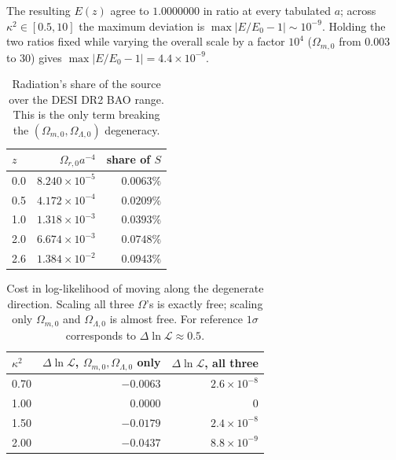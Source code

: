 \documentclass[11pt]{article}
\newcommand{\Om}{\Omega_{m,0}}
\newcommand{\Or}{\Omega_{r,0}}
\newcommand{\OL}{\Omega_{\Lambda,0}}
\begin{document}
\noindent The resulting $E(z)$ agree to $1.0000000$ in ratio at every tabulated
$a$; across $\kappa^2\in[0.5,10]$ the maximum deviation is
$\max|E/E_0-1|\sim10^{-9}$. Holding the two ratios fixed while varying the
overall scale by a factor $10^{4}$ ($\Om$ from $0.003$ to $30$) gives
$\max|E/E_0-1| = 4.4\times10^{-9}$.

\begin{table}[h]\centering
\caption{Radiation's share of the source over the DESI DR2 BAO range. This is
the only term breaking the $(\Om,\OL)$ degeneracy.}
\label{tab:rad}
\begin{tabular}{lrr}
\toprule
$z$ & $\Or a^{-4}$ & share of $S$ \\
\midrule
0.0 & $8.240\times10^{-5}$ & $0.0063\%$ \\
0.5 & $4.172\times10^{-4}$ & $0.0209\%$ \\
1.0 & $1.318\times10^{-3}$ & $0.0393\%$ \\
2.0 & $6.674\times10^{-3}$ & $0.0748\%$ \\
2.6 & $1.384\times10^{-2}$ & $0.0943\%$ \\
\bottomrule
\end{tabular}
\end{table}

\begin{table}[h]\centering
\caption{Cost in log-likelihood of moving along the degenerate direction.
Scaling all three $\Omega$'s is exactly free; scaling only $\Om$ and $\OL$ is
almost free. For reference $1\sigma$ corresponds to $\Delta\ln\mathcal{L}\approx0.5$.}
\begin{tabular}{lrr}
\toprule
$\kappa^2$ & $\Delta\ln\mathcal{L}$, $\Om,\OL$ only & $\Delta\ln\mathcal{L}$, all three \\
\midrule
0.70 & $-0.0063$ & $2.6\times10^{-8}$ \\
1.00 & $\phantom{-}0.0000$ & $0$ \\
1.50 & $-0.0179$ & $2.4\times10^{-8}$ \\
2.00 & $-0.0437$ & $8.8\times10^{-9}$ \\
\bottomrule
\end{tabular}
\end{table}
\end{document}
